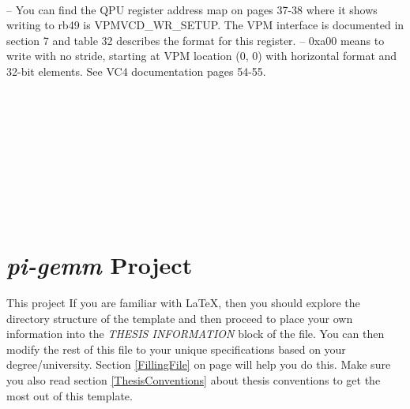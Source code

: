 \\
-- You can find the QPU register address map on pages 37-38 where it shows writing to rb49 is VPMVCD\_WR\_SETUP. The VPM interface is documented in section 7 and table 32 describes the format for this register.
-- 0xa00 means to write with no stride, starting at VPM location (0, 0) with horizontal format and 32-bit elements. See VC4 documentation pages 54-55.\\~\\

\\

\\~\\
\\~\\
\\~\\
\\


\section{\emph{pi-gemm} Project}

This project \parencite{refPiGemm}
If you are familiar with \LaTeX{}, then you should explore the directory structure of the template and then proceed to place your own information into the \emph{THESIS INFORMATION} block of the  file. You can then modify the rest of this file to your unique specifications based on your degree/university. Section \ref{FillingFile} on page \pageref{FillingFile} will help you do this. Make sure you also read section \ref{ThesisConventions} about thesis conventions to get the most out of this template.

